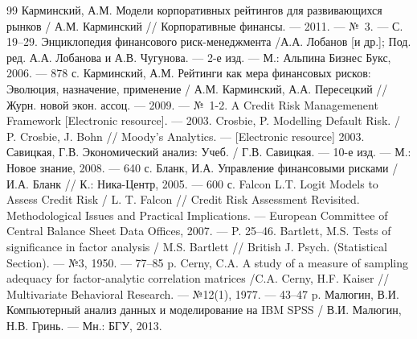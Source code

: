 \documentclass[14pt,a4paper]{extarticle}
\begin{document}
\begin{thebibliography}{99}
 Карминский, А.М. Модели корпоративных рейтингов для развивающихся рынков / А.М. Карминский // Корпоративные финансы. --- 2011. --- №~3. --- С. 19--29.
 Энциклопедия финансового риск-менеджмента /А.А. Лобанов [и др.]; Под. ред. А.А. Лобанова и А.В. Чугунова. --- 2-е изд. --- М.: Альпина Бизнес Букс, 2006. --- 878 с.
 Карминский, А.М. Рейтинги как мера финансовых рисков: Эволюция, назначение, применение / А.М. Карминский, А.А. Пересецкий // Журн. новой экон. ассоц. --- 2009. --- №~1-2.
 A Credit Risk Managemenent Framework [Electronic resource]. --- 2003.
 Crosbie, P. Modelling Default Risk. / P. Crosbie, J. Bohn // Moody's Analytics. --- [Electronic resource] 2003.
 Савицкая, Г.В. Экономический анализ: Учеб. / Г.В. Савицкая. --- 10-е изд. --- М.: Новое знание, 2008. --- 640 с.
 Бланк, И.А. Управление финансовыми рисками / И.А. Бланк // К.: Ника-Центр, 2005. --- 600 с.
 Falcon L.T. Logit Models to Assess Credit Risk / L. T. Falcon // Credit Risk Assessment Revisited. Methodological Issues and Practical Implications. --- European Committee of Central Balance Sheet Data Offices, 2007. --- P. 25--46.
 Bartlett, M.S. Tests of significance in factor analysis / M.S. Bartlett // British J. Psych. (Statistical Section). --- №3, 1950. --- 77--85 p.
 Cerny, C.A. A study of a measure of sampling adequacy for factor-analytic correlation matrices /C.A. Cerny, H.F. Kaiser // Multivariate Behavioral Research. --- №12(1), 1977. --- 43--47 p.
 Малюгин, В.И. Компьютерный анализ данных и моделирование на IBM SPSS / В.И. Малюгин, Н.В. Гринь. --- Мн.: БГУ, 2013.
\end{thebibliography}
\end{document}
